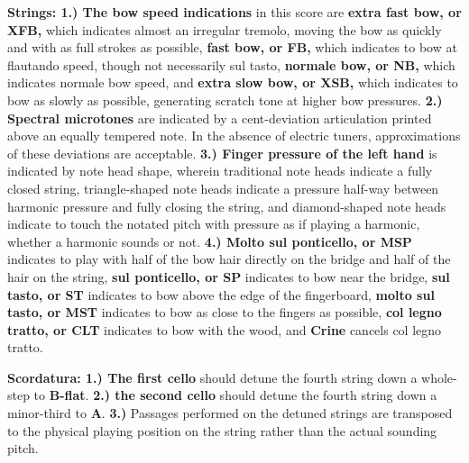 \documentclass[11pt]{article}
\begin{document}
\begingroup
\textbf{Strings: 1.) The bow speed indications} in this score are \textbf{extra fast bow, or XFB,} which indicates almost an irregular tremolo, moving the bow as quickly and with as full strokes as possible,  \textbf{fast bow, or FB,} which indicates to bow at flautando speed, though not necessarily sul tasto, \textbf{normale bow, or NB,}  which indicates normale bow speed, and \textbf{extra slow bow, or XSB,} which indicates to bow as slowly as possible, generating scratch tone at higher bow pressures. \textbf{2.) Spectral microtones} are indicated by a cent-deviation articulation printed above an equally tempered note. In the absence of electric tuners, approximations of these deviations are acceptable. \textbf{3.) Finger pressure of the left hand} is indicated by note head shape, wherein traditional note heads indicate a fully closed string, triangle-shaped note heads indicate a pressure half-way between harmonic pressure and fully closing the string, and diamond-shaped note heads indicate to touch the notated pitch with pressure as if playing a harmonic, whether a harmonic sounds or not. \textbf{4.) Molto sul ponticello, or MSP} indicates to play with half of the bow hair directly on the bridge and half of the hair on the string, \textbf{sul ponticello, or SP} indicates to bow near the bridge, \textbf{sul tasto, or ST} indicates to bow above the edge of the fingerboard, \textbf{molto sul tasto, or MST} indicates to bow as close to the fingers as possible, \textbf{col legno tratto, or CLT} indicates to bow with the wood, and \textbf{Crine} cancels col legno tratto.
\endgroup

\begingroup
\textbf{Scordatura: 1.) The first cello} should detune the fourth string down a whole-step to \textbf{B-flat}. \textbf{2.) the second cello} should detune the fourth string down a minor-third to \textbf{A}. \textbf{3.)} Passages performed on the detuned strings are transposed to the physical playing position on the string rather than the actual sounding pitch.
\endgroup
\end{document}
